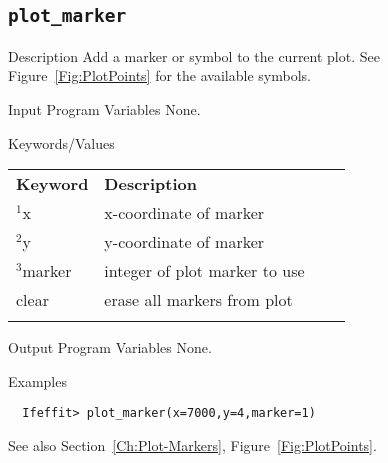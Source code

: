 \subsection{\texttt{plot\_marker}}  \label{Ch:Command:plot-marker}
\begin{IFFcom}
\item[Description] Add a marker or symbol to the current plot.
  See Figure~\ref{Fig:PlotPoints} for the available symbols.
\item[Input Program Variables] None.
\item[Keywords/Values] 

{\relax \hspace{0.25truein}\par\noindent\relax}
\begin{tabular}{llrl}
  \textbf{Keyword} &  \textbf{Description}\\
  \noalign{\smallskip}
  ${}^1${x}     & x-coordinate of marker\\
  ${}^2${y}     & y-coordinate of marker\\
  ${}^3${marker} & integer of plot marker to use\\
  clear        & erase all markers from plot\\
  \noalign{\smallskip}
\end{tabular}
\noindent
\item[Output Program Variables] None.
\item[Examples] {\hspace{1.in} \vspace{-0.1truein} \relax }
\begin{verbatim} 
  Ifeffit> plot_marker(x=7000,y=4,marker=1)
\end{verbatim}
\item[See also] Section~\ref{Ch:Plot-Markers}, Figure~\ref{Fig:PlotPoints}.
\end{IFFcom}

